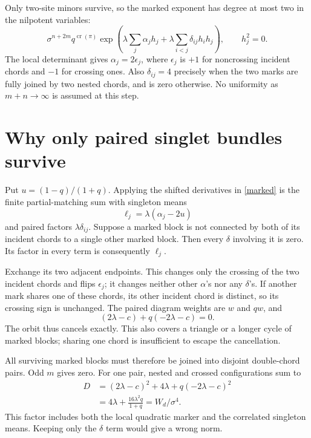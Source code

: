 \documentclass[11pt,a4paper]{article}
\newcommand{\crs}{\operatorname{cr}}
\begin{document}
Only two-site minors survive, so the marked exponent has degree at most
two in the nilpotent variables:
\begin{equation}
 \sigma^{n+2m}q^{\crs(\pi)}
 \exp\!\left(\lambda\sum_j\alpha_jh_j+
                  \lambda\sum_{i<j}\delta_{ij}h_ih_j\right),\qquad h_j^2=0.
 \label{marked}
\end{equation}
The local determinant gives $\alpha_j=2\epsilon_j$, where $\epsilon_j$
is $+1$ for noncrossing incident chords and $-1$ for crossing ones.
Also $\delta_{ij}=4$ precisely when the two marks are fully joined by
two nested chords, and is zero otherwise. No uniformity as $m+n\to\infty$
is assumed at this step.

\newpage
\section{Why only paired singlet bundles survive}
Put $u=(1-q)/(1+q)$. Applying the shifted derivatives in
\eqref{marked} is the finite partial-matching sum with singleton means
\begin{equation}
 \ell_j=\lambda(\alpha_j-2u)
\end{equation}
and paired factors $\lambda\delta_{ij}$.
Suppose a marked block is not connected by both of its incident chords
to a single other marked block. Then every $\delta$ involving it is zero.
Its factor in every term is consequently $\ell_j$.

Exchange its two adjacent endpoints. This changes only the crossing of
the two incident chords and flips $\epsilon_j$; it changes neither other
$\alpha$'s nor any $\delta$'s. If another mark shares one of these chords,
its other incident chord is distinct, so its crossing sign is unchanged.
The paired diagram weights are $w$ and $qw$, and
\begin{equation}
 (2\lambda-c)+q(-2\lambda-c)=0.\label{cancel}
\end{equation}
The orbit thus cancels exactly. This also covers a triangle or a longer
cycle of marked blocks; sharing one chord is insufficient to escape
the cancellation.

All surviving marked blocks must therefore be joined into disjoint
double-chord pairs. Odd $m$ gives zero. For one pair, nested and crossed
configurations sum to
\begin{align}
 D&=(2\lambda-c)^2+4\lambda+q(-2\lambda-c)^2\\
  &=4\lambda+\frac{16\lambda^2q}{1+q}
   =W_d/\sigma^4 .\label{pair}
\end{align}
This factor includes both the local quadratic marker and the correlated
singleton means. Keeping only the $\delta$ term would give a wrong norm.
\end{document}
